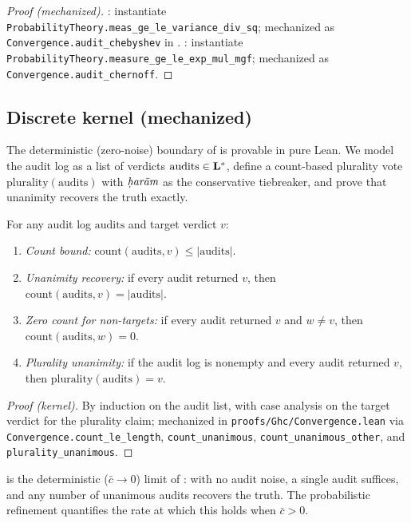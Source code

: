 \begin{proof}[Proof (mechanized)]
: instantiate
\texttt{ProbabilityTheory.meas\_ge\_le\_va\-riance\_div\_sq};
mechanized as \texttt{Convergence.audit\_chebyshev} in
.
: instantiate
\texttt{ProbabilityTheory.measure\_ge\_le\_exp\_mul\_mgf};
mechanized as \texttt{Convergence.audit\_chernoff}.
\end{proof}

\subsection{Discrete kernel (mechanized)}

The deterministic (zero-noise) boundary of  is
provable in pure Lean. We model the audit log as a list of verdicts
$\mathrm{audits} \in \Lat^*$, define a count-based plurality vote
$\mathrm{plurality}(\mathrm{audits})$ with $\haram$ as the conservative
tiebreaker, and prove that unanimity recovers the truth exactly.

\begin{theorem}
\label{thm:convergence-kernel}
For any audit log $\mathrm{audits}$ and target verdict $v$:
\begin{enumerate}[label=(C\arabic*)]
  \item \emph{Count bound:} $\mathrm{count}(\mathrm{audits}, v) \leq
        |\mathrm{audits}|$.
  \item \emph{Unanimity recovery:} if every audit returned $v$, then
        $\mathrm{count}(\mathrm{audits}, v) = |\mathrm{audits}|$.
  \item \emph{Zero count for non-targets:} if every audit returned $v$
        and $w \neq v$, then $\mathrm{count}(\mathrm{audits}, w) = 0$.
  \item \emph{Plurality unanimity:} if the audit log is nonempty and
        every audit returned $v$, then
        $\mathrm{plurality}(\mathrm{audits}) = v$.
\end{enumerate}
\end{theorem}

\begin{proof}[Proof (kernel)]
By induction on the audit list, with case analysis on the target
verdict for the plurality claim; mechanized in
\texttt{proofs/Ghc/Conver\-gence.lean} via
\texttt{Convergence.count\_le\_length}, \texttt{count\_unanimous},
\texttt{count\_unanimous\_other}, and \texttt{plurality\_unanimous}.
\end{proof}

 is the deterministic ($\bar c \to 0$)
limit of : with no audit noise, a single audit
suffices, and any number of unanimous audits recovers the truth. The
probabilistic refinement quantifies the rate at which this holds when
$\bar c > 0$.
